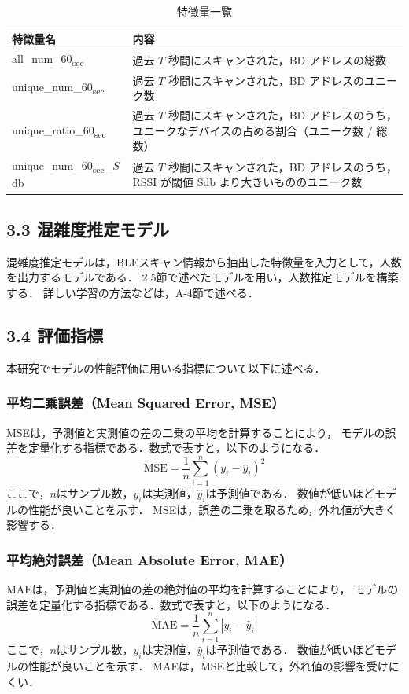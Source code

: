 \begin{table}[tb]
	\centering
	\caption{特徴量一覧}
	\label{tbl:feastures}
	\small
	\doublerulesep=0.3pt
    \begin{tabular}{l|p{5cm}} \hline\hline\hline
		特徴量名 & 内容 \\ \hline
		all\_num\_60\textsubscript{sec} & 過去 $T$ 秒間にスキャンされた，BD アドレスの総数\\ \hline
    unique\_num\_60\textsubscript{sec} & 過去 $T$ 秒間にスキャンされた，BD アドレスのユニーク数 \\ \hline
    unique\_ratio\_60\textsubscript{sec} & 過去 $T$ 秒間にスキャンされた，BD アドレスのうち，ユニークなデバイスの占める割合（ユニーク数 / 総数） \\ \hline
    unique\_num\_60\textsubscript{sec}\_$S$db & 過去 $T$ 秒間にスキャンされた，BD アドレスのうち，RSSI が閾値 Sdb より大きいもののユニーク数 \\ \hline\hline\hline
	\end{tabular}
\end{table}

\subsection*{3.3 混雑度推定モデル}
混雑度推定モデルは，BLEスキャン情報から抽出した特徴量を入力として，人数を出力するモデルである．
2.5節で述べたモデルを用い，人数推定モデルを構築する．
詳しい学習の方法などは，A-4節で述べる．

\subsection*{3.4 評価指標}
本研究でモデルの性能評価に用いる指標について以下に述べる．

\subsubsection*{平均二乗誤差（Mean Squared Error, MSE）}
MSEは，予測値と実測値の差の二乗の平均を計算することにより，
モデルの誤差を定量化する指標である．数式で表すと，以下のようになる．
\begin{equation}
  \label{eq:mse}
  \mathrm{MSE} = \frac{1}{n} \sum_{i=1}^{n} (y_i - \hat{y}_i)^2
\end{equation}
ここで，$n$はサンプル数，$y_i$は実測値，$\hat{y}_i$は予測値である．
数値が低いほどモデルの性能が良いことを示す．
MSEは，誤差の二乗を取るため，外れ値が大きく影響する．

\subsubsection*{平均絶対誤差（Mean Absolute Error, MAE）}
MAEは，予測値と実測値の差の絶対値の平均を計算することにより，
モデルの誤差を定量化する指標である．数式で表すと，以下のようになる．
\begin{equation}
  \label{eq:mae}
  \mathrm{MAE} = \frac{1}{n} \sum_{i=1}^{n} |y_i - \hat{y}_i|
\end{equation}
ここで，$n$はサンプル数，$y_i$は実測値，$\hat{y}_i$は予測値である．
数値が低いほどモデルの性能が良いことを示す．
MAEは，MSEと比較して，外れ値の影響を受けにくい．


